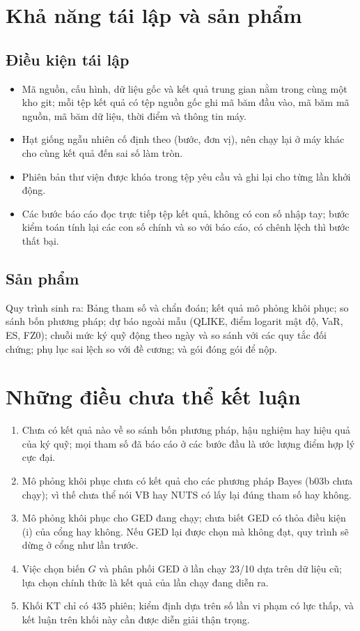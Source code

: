 \documentclass[12pt,a4paper]{article}
\theoremstyle{remark}
\newcommand{\KT}{\mathrm{KT}}
\begin{document}
\section{Khả năng tái lập và sản phẩm}

\subsection{Điều kiện tái lập}

\begin{itemize}
\item Mã nguồn, cấu hình, dữ liệu gốc và kết quả trung gian nằm trong cùng một kho git; mỗi tệp kết quả có tệp nguồn gốc ghi mã băm đầu vào, mã băm mã nguồn, mã băm dữ liệu, thời điểm và thông tin máy.
\item Hạt giống ngẫu nhiên cố định theo (bước, đơn vị), nên chạy lại ở máy khác cho cùng kết quả đến sai số làm tròn.
\item Phiên bản thư viện được khóa trong tệp yêu cầu và ghi lại cho từng lần khởi động.
\item Các bước báo cáo đọc trực tiếp tệp kết quả, không có con số nhập tay; bước kiểm toán tính lại các con số chính và so với báo cáo, có chênh lệch thì bước thất bại.
\end{itemize}

\subsection{Sản phẩm}

Quy trình sinh ra: Bảng tham số và chẩn đoán; kết quả mô phỏng khôi phục; so sánh bốn phương pháp; dự báo ngoài mẫu (QLIKE, điểm logarit mật độ, VaR, ES, FZ0); chuỗi mức ký quỹ động theo ngày và so sánh với các quy tắc đối chứng; phụ lục sai lệch so với đề cương; và gói đóng gói để nộp.

\section{Những điều chưa thể kết luận}\label{sec:chuaKetLuan}

\begin{enumerate}
\item Chưa có kết quả nào về so sánh bốn phương pháp, hậu nghiệm hay hiệu quả của ký quỹ; mọi tham số đã báo cáo ở các bước đầu là ước lượng điểm hợp lý cực đại.
\item Mô phỏng khôi phục chưa có kết quả cho các phương pháp Bayes (b03b chưa chạy); vì thế chưa thể nói VB hay NUTS có lấy lại đúng tham số hay không.
\item Mô phỏng khôi phục cho GED đang chạy; chưa biết GED có thỏa điều kiện (i) của cổng hay không. Nếu GED lại được chọn mà không đạt, quy trình sẽ dừng ở cổng như lần trước.
\item Việc chọn biến $G$ và phân phối GED ở lần chạy 23/10 dựa trên dữ liệu cũ; lựa chọn chính thức là kết quả của lần chạy đang diễn ra.
\item Khối $\KT$ chỉ có $435$ phiên; kiểm định dựa trên số lần vi phạm có lực thấp, và kết luận trên khối này cần được diễn giải thận trọng.
\end{enumerate}
\end{document}
